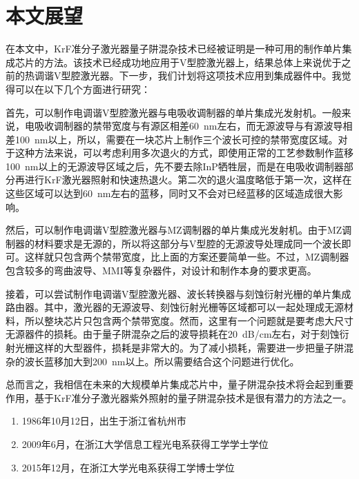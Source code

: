 \documentclass{ZJUthesis}
\begin{document}
\section{本文展望}

在本文中，KrF准分子激光器量子阱混杂技术已经被证明是一种可用的制作单片集成芯片的方法。该技术已经成功地应用于V型腔激光器上，结果总体上来说优于之前的热调谐V型腔激光器。下一步，我们计划将这项技术应用到集成器件中。我觉得可以在以下几个方面进行研究：

首先，可以制作电调谐V型腔激光器与电吸收调制器的单片集成光发射机。一般来说，电吸收调制器的禁带宽度与有源区相差60~nm左右，而无源波导与有源波导相差100~nm以上，所以，需要在一块芯片上制作三个波长可控的禁带宽度区域。对于这种方法来说，可以考虑利用多次退火的方式，即使用正常的工艺参数制作蓝移100~nm以上的无源波导区域之后，先不要去除InP牺牲层，而是在电吸收调制器部分再进行KrF激光器照射和快速热退火。第二次的退火温度略低于第一次，这样在这些区域可以达到60~nm左右的蓝移，同时又不会对已经蓝移的区域造成很大影响。

然后，可以制作电调谐V型腔激光器与MZ调制器的单片集成光发射机。由于MZ调制器的材料要求是无源的，所以将这部分与V型腔的无源波导处理成同一个波长即可。这样就只包含两个禁带宽度，比上面的方案还要简单一些。不过，MZ调制器包含较多的弯曲波导、MMI等复杂器件，对设计和制作本身的要求更高。

接着，可以尝试制作电调谐V型腔激光器、波长转换器与刻蚀衍射光栅的单片集成路由器。其中，激光器的无源波导、刻蚀衍射光栅等区域都可以一起处理成无源材料，所以整块芯片只包含两个禁带宽度。然而，这里有一个问题就是要考虑大尺寸无源器件的损耗。由于量子阱混杂之后的波导损耗在20~dB/cm左右，对于刻蚀衍射光栅这样的大型器件，损耗是非常大的。为了减小损耗，需要进一步把量子阱混杂的波长蓝移加大到200~nm以上。所以需要结合这个问题进行优化。

总而言之，我相信在未来的大规模单片集成芯片中，量子阱混杂技术将会起到重要作用，基于KrF准分子激光器紫外照射的量子阱混杂技术是很有潜力的方法之一。

\ZJUbackmatter



\begin{resume}
\begin{enumerate}
\item{1986年10月12日，出生于浙江省杭州市}
\item{2009年6月，在浙江大学信息工程光电系获得工学学士学位}
\item{2015年12月，在浙江大学光电系获得工学博士学位}
\end{enumerate}
\end{resume}
\end{document}
